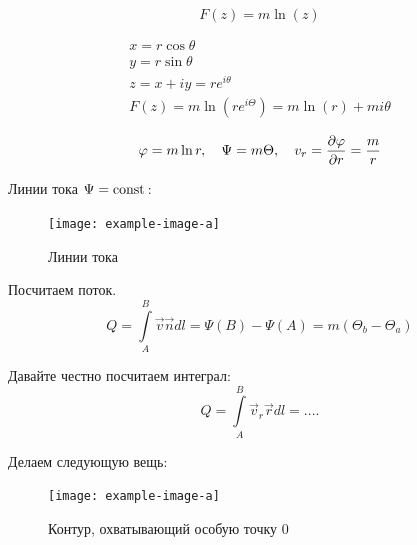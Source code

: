 \begin{equation}
	F(z)=m\ln(z)
\end{equation}

\begin{gather}
	\label{eqss}
	x=r\cos\theta\\
	y=r\sin\theta\\
	z=x+iy=re^{i\theta}\\
	F(z)=m\ln(re^{i\Theta})=m\ln(r)+mi\theta
\end{gather}

\begin{equation}
	\varphi=m\ln{r}, \quad \Psi=m\Theta, \quad v_r=\pdv{\varphi}{r}=\frac{m}{r}
\end{equation}

Линии тока $\Psi=\mathrm{const}\,$:
\begin{figure}[h!]
    \centering
    \texttt{[image: example-image-a]}
    \caption{Линии тока}
    \label{fig:figure1}
\end{figure}

Посчитаем поток. 
\begin{equation}
	Q=\int\limits_{A}^{B} \vec{v}\vec{n}dl=\Psi(B)-\Psi(A)=m(\Theta_b-\Theta_a)
\end{equation}

Давайте честно посчитаем интеграл:
\begin{equation}
	Q=\int\limits_{A}^{B} \vec{v}_r\vec{r}dl=.... %
\end{equation}

Делаем следующую вещь:
\begin{figure}[h!]
    \centering
    \texttt{[image: example-image-a]}
    \caption{Контур, охватывающий особую точку 0}
    \label{fig:figure1}
\end{figure}

